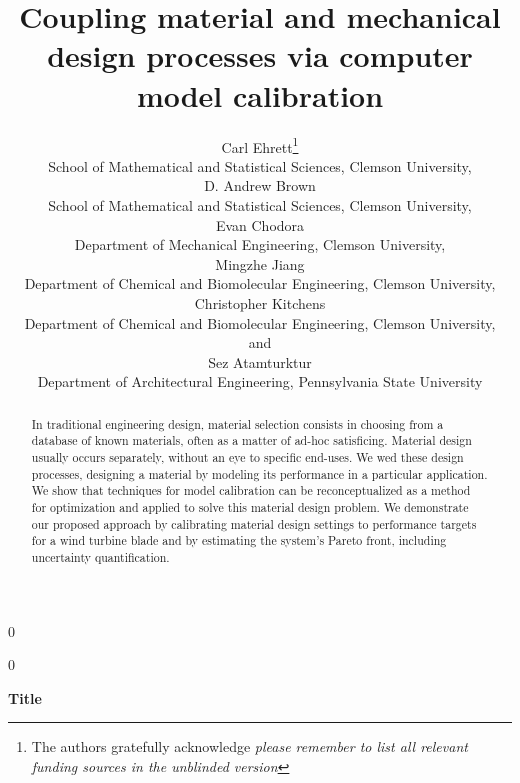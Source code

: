 \documentclass[12pt]{article}
\newcommand{\blind}{0}
\begin{document}
%

\def\spacingset#1{\renewcommand{\baselinestretch}%
{#1}\small\normalsize} \spacingset{1}



\blind
{
  \title{\bf Coupling material and mechanical design processes via computer model calibration}
  \author{Carl Ehrett\thanks{
    The authors gratefully acknowledge \textit{please remember to list all relevant funding sources in the unblinded version}}\hspace{.2cm}\\
    School of Mathematical and Statistical Sciences, Clemson University,\\
    D. Andrew Brown \\
    School of Mathematical and Statistical Sciences, Clemson University,\\
    Evan Chodora \\
    Department of Mechanical Engineering, Clemson University,\\
    Mingzhe Jiang \\
    Department of Chemical and Biomolecular Engineering, Clemson University,\\
    Christopher Kitchens \\
    Department of Chemical and Biomolecular Engineering, Clemson University,\\
    and \\
    Sez Atamturktur \\
    Department of Architectural Engineering, Pennsylvania State University\\}
  \maketitle
} \fi

\blind
{
  \bigskip
  \bigskip
  \bigskip
  \begin{center}
    {\LARGE\bf Title}
\end{center}
  \medskip
} \fi

\bigskip
\begin{abstract}
In traditional engineering design, material selection consists in choosing from a database of known materials, often as a matter of ad-hoc satisficing. 
%
Material design usually occurs separately, without an eye to specific end-uses.
%
We wed these design processes, designing a material by modeling its performance in a particular application. 
%
We show that techniques for model calibration can be reconceptualized as a method for optimization and applied to solve this material design problem. 
%
We demonstrate our proposed approach by calibrating material design settings to performance targets for a wind turbine blade and by estimating the system’s Pareto front, including uncertainty quantification. 
\end{abstract}
\end{document}
